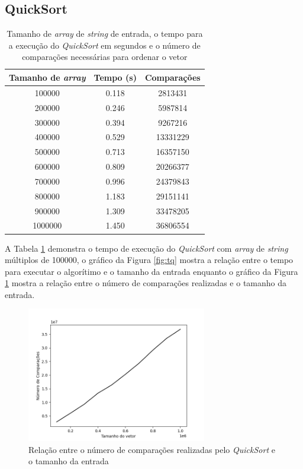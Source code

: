 \documentclass[12pt,a4paper,oneside]{article}
\begin{document}
\subsection{QuickSort}

\begin{table}[H]
\caption{Tamanho de \textit{array} de \textit{string} de entrada, o tempo para a execução do \textit{QuickSort} em segundos e o número de comparações necessárias para ordenar o vetor }
\label{tab:dq}
\begin{center}
\begin{tabular}{|c c c|}
\hline
Tamanho de \textit{array}	& Tempo (s)	& Comparações 	\\
\hline
100000 & 0.118 & 2813431\\
200000 & 0.246 & 5987814\\
300000 & 0.394 & 9267216\\
400000 & 0.529 & 13331229\\
500000 & 0.713 & 16357150\\
600000 & 0.809 & 20266377\\
700000 & 0.996 & 24379843\\
800000 & 1.183 & 29151141\\
900000 & 1.309 & 33478205\\
1000000 & 1.450 & 36806554\\
\hline
\end{tabular}
\end{center}
\end{table}

\quad A Tabela \ref{tab:dq} demonstra o tempo de execução do \textit{QuickSort} com \textit{array} de \textit{string} múltiplos de 100000, o gráfico da Figura \ref{fig:tq} mostra a relação entre o tempo para executar o algorítimo e o tamanho da entrada enquanto o gráfico da Figura \ref{fig:nq} mostra a relação entre o número de comparações realizadas e o tamanho da entrada.

\begin{figure}[H]
\begin{center}
    \includegraphics[width=0.7\textwidth]{FigNQ.png} 
\end{center}
\caption{Relação entre o número de comparações realizadas pelo \textit{QuickSort} e o tamanho da entrada}
\label{fig:nq}
\end{figure}
\end{document}
